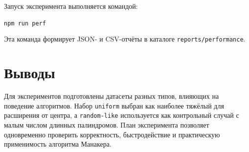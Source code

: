 Запуск эксперимента выполняется командой:
\begin{center}
\texttt{npm run perf}
\end{center}

Эта команда формирует JSON- и CSV-отчёты в каталоге \texttt{reports/performance}.

\section{Выводы} \label{ch2:conclusion}

Для экспериментов подготовлены датасеты разных типов, влияющих на поведение алгоритмов. Набор \texttt{uniform} выбран как наиболее тяжёлый для расширения от центра, а \texttt{random-like} используется как контрольный случай с малым числом длинных палиндромов. План эксперимента позволяет одновременно проверить корректность, быстродействие и практическую применимость алгоритма Манакера.
